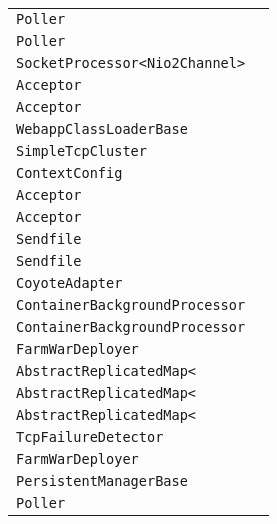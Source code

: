 \begin{center}
\begin{tabular}{ll}
\lstinline/Poller/&\raisebox{0pt}{\lstinline/ timeout(int,boolean)/}\\ 
\lstinline/Poller/&\raisebox{0pt}{\lstinline/ timeout(int,boolean)/}\\ 
\lstinline/SocketProcessor<Nio2Channel>/&\raisebox{0pt}{\lstinline/ doRun()/}\\ 
\lstinline/Acceptor/&\raisebox{0pt}{\lstinline/ run()/}\\ 
\lstinline/Acceptor/&\raisebox{0pt}{\lstinline/ run()/}\\ 
\lstinline/WebappClassLoaderBase/&\raisebox{0pt}{\lstinline/ findClassInternal(String)/}\\ 
\lstinline/SimpleTcpCluster/&\raisebox{0pt}{\lstinline/ memberDisappeared(Member)/}\\ 
\lstinline/ContextConfig/&\raisebox{0pt}{\lstinline/ processAnnotationsFile(File)/}\\ 
\lstinline/Acceptor/&\raisebox{0pt}{\lstinline/ run()/}\\ 
\lstinline/Acceptor/&\raisebox{0pt}{\lstinline/ run()/}\\ 
\lstinline/Sendfile/&\raisebox{0pt}{\lstinline/ SendfileStateadd(SendfileData)/}\\ 
\lstinline/Sendfile/&\raisebox{0pt}{\lstinline/ SendfileStateadd(SendfileData)/}\\ 
\lstinline/CoyoteAdapter/&\raisebox{0pt}{\lstinline/ convertURI(MessageBytes)/}\\ 
\lstinline/ContainerBackgroundProcessor/&\raisebox{0pt}{\lstinline/ processChildren(Container)/}\\ 
\lstinline/ContainerBackgroundProcessor/&\raisebox{0pt}{\lstinline/ processChildren(Container)/}\\ 
\lstinline/FarmWarDeployer/&\raisebox{0pt}{\lstinline/ copy(File,File)/}\\ 
\lstinline/AbstractReplicatedMap</&\raisebox{0pt}{\lstinline/ Vput()/}\\ 
\lstinline/AbstractReplicatedMap</&\raisebox{0pt}{\lstinline/ Vput()/}\\ 
\lstinline/AbstractReplicatedMap</&\raisebox{0pt}{\lstinline/ Vput()/}\\ 
\lstinline/TcpFailureDetector/&\raisebox{0pt}{\lstinline/ memberAlive(Member)/}\\ 
\lstinline/FarmWarDeployer/&\raisebox{0pt}{\lstinline/ copy(File,File)/}\\ 
\lstinline/PersistentManagerBase/&\raisebox{0pt}{\lstinline/ startInternal()/}\\ 
\lstinline/Poller/&\raisebox{0pt}{\lstinline/ timeout(int,boolean)/}\\ 

\end{tabular}
\end{center}
